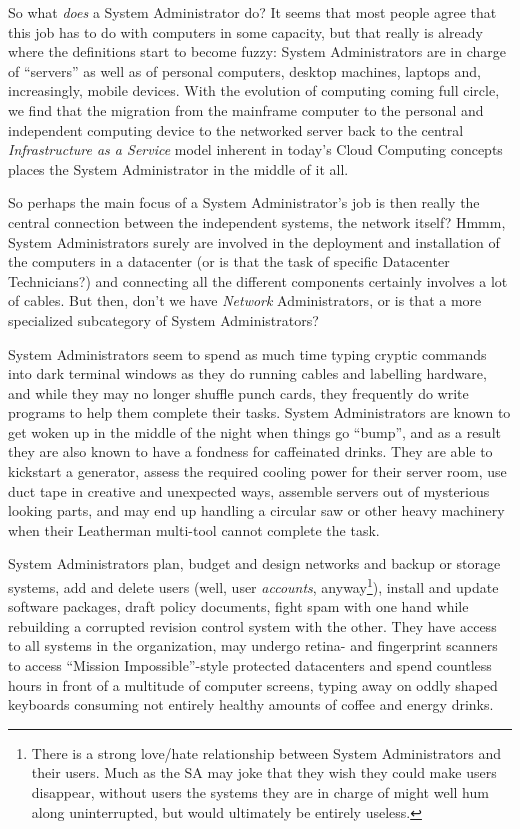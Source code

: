 So what {\em does} a System Administrator do?  It
seems that most people agree that this job has to do
with computers in some capacity, but that really is
already where the definitions start to become fuzzy:
System Administrators are in charge of ``servers'' as
well as of personal computers, desktop machines,
laptops and, increasingly, mobile devices.  With the
evolution of computing coming full circle, we find
that the migration from the mainframe computer to the
personal and independent computing device to the
networked server back to the central {\em
Infrastructure as a Service} model inherent in today's Cloud
Computing concepts places the
System Administrator in the middle of it all.

So perhaps the main focus of a System Administrator's
job is then really the central connection between the
independent systems, the network itself?  Hmmm, System
Administrators surely are involved in the deployment
and installation of the computers in a datacenter (or
is that the task of specific Datacenter Technicians?)
and connecting all the different components certainly
involves a lot of cables.  But then, don't we have
{\em Network} Administrators, or is that a more
specialized subcategory of System Administrators?

System Administrators seem to spend as much time
typing cryptic commands into dark terminal windows as
they do running cables and labelling hardware, and
while they may no longer shuffle punch cards, they
frequently do write programs to help them complete
their tasks.  System Administrators are known to get
woken up in the middle of the night when things go
``bump'', and as a result they are also known to have
a fondness for caffeinated drinks.  They are able to
kickstart a generator, assess the required cooling
power for their server room, use duct tape in creative
and unexpected ways, assemble servers out of
mysterious looking parts, and may end up handling a
circular saw or other heavy machinery when their
Leatherman multi-tool cannot complete the task.

System Administrators plan, budget and design networks
and backup or storage systems, add and delete users
(well, user {\em accounts}, anyway\footnote{There is a
strong love/hate relationship between System
Administrators and their users.  Much as the SA may
joke that they wish they could make users disappear,
without users the systems they are in charge of might
well hum along uninterrupted, but would ultimately be
entirely useless.}), install and update software
packages, draft policy documents, fight spam with one
hand while rebuilding a corrupted revision control
system with the other.  They have access to all
systems in the organization, may undergo retina- and
fingerprint scanners to access ``Mission
Impossible''-style protected datacenters and spend
countless hours in front of a multitude of computer
screens, typing away on oddly shaped keyboards
consuming not entirely healthy amounts of coffee and
energy drinks.

